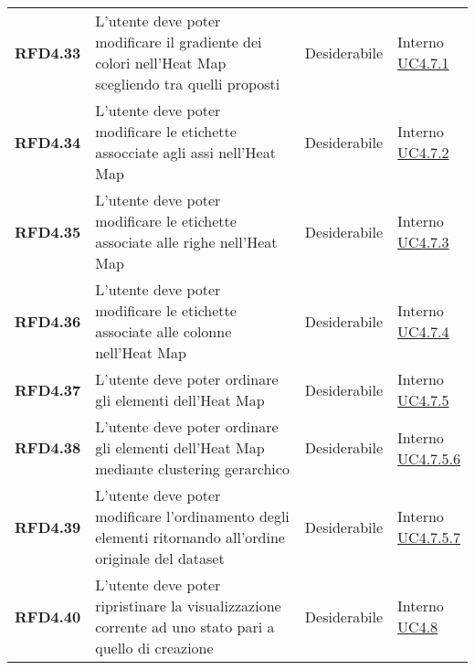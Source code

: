 \begin{longtable}[H]{>{\raggedright\bfseries}m{20mm} >{\raggedright}m{90mm} >{\raggedright}m{28mm} >{\raggedright\arraybackslash}m{30mm}}
    RFD4.33
    & L'utente deve poter modificare il gradiente dei colori nell'Heat Map scegliendo tra quelli proposti
    & Desiderabile
    & \makecell{ Interno \\  \hyperref[par:uc4.7.1]{UC4.7.1} }\\

    RFD4.34
    & L'utente deve poter modificare le etichette assocciate agli assi nell'Heat Map
    & Desiderabile
    & \makecell{ Interno \\  \hyperref[par:uc4.7.2]{UC4.7.2} }\\

    RFD4.35
    & L'utente deve poter modificare le etichette associate alle righe nell'Heat Map
    & Desiderabile
    & \makecell{ Interno \\  \hyperref[par:uc4.7.3]{UC4.7.3} }\\

    RFD4.36
    & L'utente deve poter modificare le etichette associate alle colonne nell'Heat Map
    & Desiderabile
    & \makecell{ Interno \\  \hyperref[par:uc4.7.4]{UC4.7.4} }\\

    RFD4.37
    & L'utente deve poter ordinare gli elementi dell'Heat Map
    & Desiderabile
    & \makecell{ Interno \\  \hyperref[par:uc4.7.5]{UC4.7.5} }\\

    RFD4.38
    & L'utente deve poter ordinare gli elementi dell'Heat Map mediante clustering gerarchico
    & Desiderabile
    & \makecell{ Interno \\  \hyperref[spar:uc4.7.5.6]{UC4.7.5.6} }\\

    RFD4.39
    & L'utente deve poter modificare l'ordinamento degli elementi ritornando all'ordine originale del dataset
    & Desiderabile
    & \makecell{ Interno \\  \hyperref[spar:uc4.7.5.7]{UC4.7.5.7} }\\

    RFD4.40
    & L'utente deve poter ripristinare la visualizzazione corrente ad uno stato pari a quello di creazione
    & Desiderabile
    & \makecell{ Interno \\  \hyperref[ssub:uc4.8]{UC4.8} }\\

\end{longtable}
